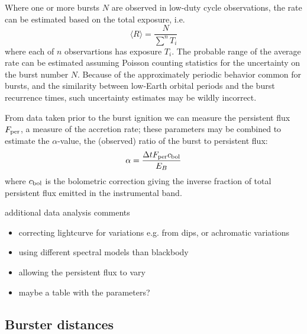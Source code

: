 \documentclass{aastex63}
\begin{document}
Where one or more bursts $N$ are observed in low-duty cycle observations, the rate can be estimated based on the total exposure, i.e.
\begin{equation}
\langle R\rangle = \frac{N}{\sum^n T_i}
\end{equation}
where each of $n$ observartions has exposure $T_i$. The probable range of the average rate can be estimated assuming Poisson counting statistics for the uncertainty on the burst number $N$. Because of the approximately periodic behavior common for bursts, and the similarity between low-Earth orbital periods and the burst recurrence times, such uncertainty estimates may be wildly incorrect.

From data taken prior to the burst ignition we can measure the persistent flux $F_{\rm per}$, a measure of the accretion rate; 
%
these parameters may be combined to estimate the $\alpha$-value, the (observed) ratio of the burst to persistent flux: 
\begin{equation}
\alpha = \frac{\Delta t F_{\rm per} c_{\rm bol}}{E_B}
\end{equation}
where $c_{\rm bol}$ is the bolometric correction giving the inverse fraction of total persistent flux emitted in the instrumental band.

additional data analysis comments
\begin{itemize}
\item correcting lightcurve for variations e.g. from dips, or achromatic variations
\item using different spectral models than blackbody
\item allowing the persistent flux to vary
\item maybe a table with the parameters?
\end{itemize}

\subsection{Burster distances}
\label{subsec:distance}
\end{document}

